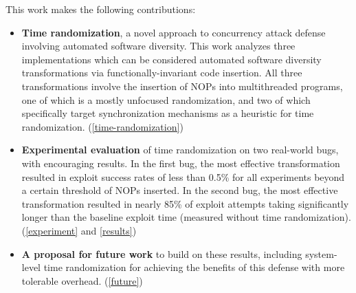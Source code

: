 This work makes the following contributions:
\begin{itemize}
	\item \textbf{Time randomization}, a novel approach to concurrency attack defense involving automated software diversity.
	This work analyzes three implementations which can be considered automated software diversity transformations via functionally-invariant code insertion.
	All three transformations involve the insertion of NOPs into multithreaded programs, one of which is a mostly unfocused randomization, and two of which specifically target synchronization mechanisms as a heuristic for time randomization.
	(\autoref{time-randomization})
	\item \textbf{Experimental evaluation} of time randomization on two real-world bugs, with encouraging results.
	In the first bug, the most effective transformation resulted in exploit success rates of less than 0.5\% for all experiments beyond a certain threshold of NOPs inserted.
	In the second bug, the most effective transformation resulted in nearly 85\% of exploit attempts taking significantly longer than the baseline exploit time (measured without time randomization).
	(\autoref{experiment} and \autoref{results})
	\item \textbf{A proposal for future work} to build on these results, including system-level time randomization for achieving the benefits of this defense with more tolerable overhead.
	(\autoref{future})
\end{itemize}
